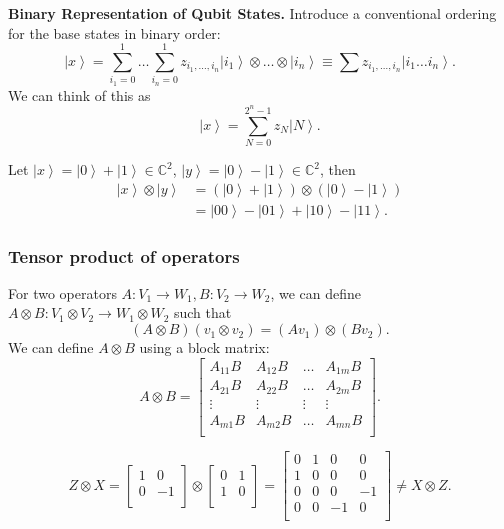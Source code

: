 \textbf{Binary Representation of Qubit States.}
Introduce a conventional ordering for the base states in binary order:
\[
	\left| x \right\rangle  = \sum_{i_1 = 0}^1 \ldots \sum_{i _n = 0}^1 z_{i_1, \ldots, i_n} \left| i_1 \right\rangle  \otimes  \ldots \otimes  \left| i_n \right\rangle 
	\equiv \sum z_{i_1, \ldots, i_n} \left| i_1 \ldots i_n \right\rangle 
.\] 
We can think of this as
\[
	\left| x \right\rangle = \sum_{N = 0}^{2^n - 1} z_N \left| N \right\rangle 
.\] 

\begin{example}
	Let $\left| x \right\rangle = \left| 0 \right\rangle  + \left| 1 \right\rangle  \in \mathbb{C}^2$,  $\left| y \right\rangle  = \left| 0 \right\rangle  - \left| 1 \right\rangle  \in \mathbb{C}^2$, then
	\begin{align*}
		\left| x \right\rangle \otimes \left| y \right\rangle &= \left( \left| 0 \right\rangle  + \left| 1 \right\rangle  \right) \otimes \left( \left| 0 \right\rangle  - \left| 1 \right\rangle  \right)  \\
		&= \left| 00 \right\rangle - \left| 01 \right\rangle  + \left| 10 \right\rangle  - \left| 11 \right\rangle  
	.\end{align*}
\end{example}

\subsubsection{Tensor product of operators}

For two operators $A: V_1 \to W_1, B: V_2 \to W_2$, we can define $A \otimes B: V_1 \otimes V_2 \to W_1 \otimes W_2$ such that
\[
	(A \otimes B) (v_1 \otimes v_2) = (A v_1) \otimes (B v_2)
.\] 
We can define $A \otimes B$ using a block matrix:
\[
	A \otimes B = 
	\begin{bmatrix}
		A_{1 1}B & A_{1 2} B & \ldots & A_{1 m}B \\
		A_{2 1}B & A_{2 2}B & \ldots & A_{2 m}B \\
		\vdots & \vdots & \vdots & \vdots \\
		A_{m 1}B & A_{m 2}B & \ldots & A_{m n}B \\
	\end{bmatrix}
.\] 

\begin{example}
	\[
		Z \otimes X = 
		\begin{bmatrix}
			1 & 0 \\
			0 & -1 \\
		\end{bmatrix}
		\otimes 
		\begin{bmatrix}
			0 & 1 \\
			1 & 0 \\
		\end{bmatrix}
		=
		\begin{bmatrix}
			0 & 1 & 0 & 0 \\
			1 & 0 & 0 & 0 \\
			0 & 0 & 0 & -1 \\
			0 & 0 & -1 & 0 \\
		\end{bmatrix}
		\neq X \otimes Z
	.\] 
\end{example}


